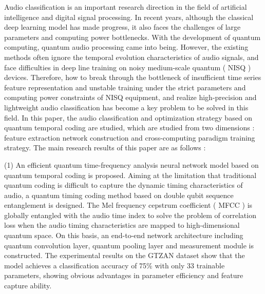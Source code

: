 
\begin{abstracten}\setlength{\baselineskip}{20pt}%
Audio classification is an important research direction in the field of artificial intelligence and digital signal processing. In recent years, although the classical deep learning model has made progress, it also faces the challenges of large parameters and computing power bottlenecks. With the development of quantum computing, quantum audio processing came into being. However, the existing methods often ignore the temporal evolution characteristics of audio signals, and face difficulties in deep line training on noisy medium-scale quantum ( NISQ ) devices. Therefore, how to break through the bottleneck of insufficient time series feature representation and unstable training under the strict parameters and computing power constraints of NISQ equipment, and realize high-precision and lightweight audio classification has become a key problem to be solved in this field. In this paper, the audio classification and optimization strategy based on quantum temporal coding are studied, which are studied from two dimensions : feature extraction network construction and cross-computing paradigm training strategy. The main research results of this paper are as follows : 
 
(1) An efficient quantum time-frequency analysis neural network model based on quantum temporal coding is proposed. Aiming at the limitation that traditional quantum coding is difficult to capture the dynamic timing characteristics of audio, a quantum timing coding method based on double qubit sequence entanglement is designed. The Mel frequency cepstrum coefficient ( MFCC ) is globally entangled with the audio time index to solve the problem of correlation loss when the audio timing characteristics are mapped to high-dimensional quantum space. On this basis, an end-to-end network architecture including quantum convolution layer, quantum pooling layer and measurement module is constructed. The experimental results on the GTZAN dataset show that the model achieves a classification accuracy of 75\% with only 33 trainable parameters, showing obvious advantages in parameter efficiency and feature capture ability.


\end{abstracten}
